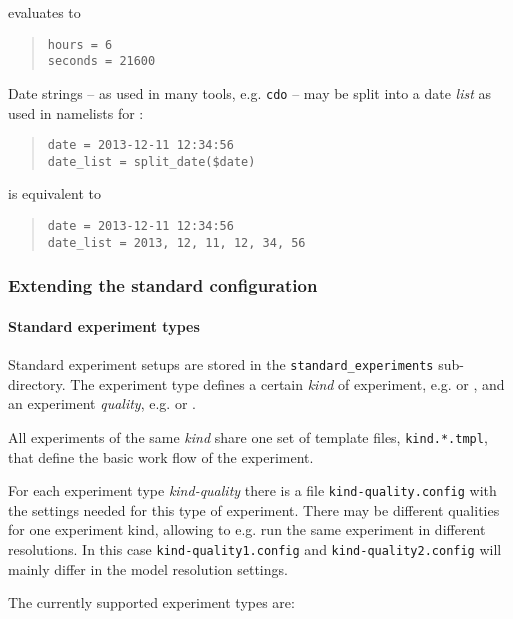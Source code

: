 evaluates to
%
\begin{quote}
\begin{verbatim}
hours = 6
seconds = 21600
\end{verbatim}
\end{quote}

Date strings -- as used in many tools, e.g. \verb|cdo| -- may be split into
a date \emph{list} as used in namelists for \echam:
%
\begin{quote}
\begin{verbatim}
date = 2013-12-11 12:34:56
date_list = split_date($date)
\end{verbatim}
\end{quote}

is equivalent to
%
\begin{quote}
\begin{verbatim}
date = 2013-12-11 12:34:56
date_list = 2013, 12, 11, 12, 34, 56
\end{verbatim}
\end{quote}


\subsubsection{Extending the standard configuration}


\paragraph*{Standard experiment types%
  \label{standard-experiment-types}%
}

Standard experiment setups are stored in the \texttt{standard\_experiments}
sub-directory. The experiment type defines a certain \emph{kind} of experiment,
e.g.  or , and an experiment \emph{quality}, e.g.
 or .

All experiments of the same \emph{kind} share one set of template files,
\texttt{kind.*.tmpl}, that define the basic work flow of the experiment.

For each experiment type \emph{kind-quality} there is a file
\texttt{kind-quality.config} with the settings needed for this type of
experiment. There may be different qualities for one experiment kind, allowing
to e.g. run the same experiment in different resolutions. In this case
\texttt{kind-quality1.config} and \texttt{kind-quality2.config} will mainly
differ in the model resolution settings.

The currently supported experiment types are:

